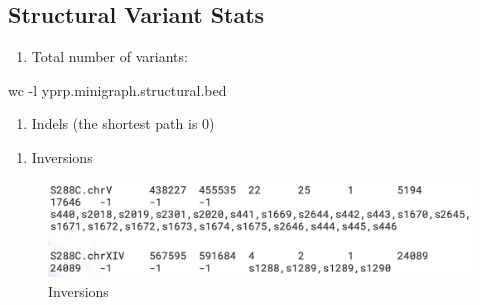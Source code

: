 \documentclass[
]{book}
\newenvironment{Shaded}{\begin{snugshade}}{\end{snugshade}}
\newcommand{\AttributeTok}[1]{\textcolor[rgb]{0.77,0.63,0.00}{#1}}
\newcommand{\ExtensionTok}[1]{#1}
\newcommand{\FunctionTok}[1]{\textcolor[rgb]{0.00,0.00,0.00}{#1}}
\newcommand{\KeywordTok}[1]{\textcolor[rgb]{0.13,0.29,0.53}{\textbf{#1}}}
\newcommand{\NormalTok}[1]{#1}
\newcommand{\StringTok}[1]{\textcolor[rgb]{0.31,0.60,0.02}{#1}}
\providecommand{\tightlist}{%
  \setlength{\itemsep}{0pt}\setlength{\parskip}{0pt}}
\begin{document}
\hypertarget{structural-variant-stats}{%
\subsection*{Structural Variant Stats}\label{structural-variant-stats}}

\begin{enumerate}
\def\labelenumi{\arabic{enumi}.}
\tightlist
\item
  Total number of variants:
\end{enumerate}

\begin{Shaded}
\begin{Highlighting}[]
\FunctionTok{wc} \AttributeTok{{-}l}\NormalTok{ yprp.minigraph.structural.bed}
\end{Highlighting}
\end{Shaded}

\begin{enumerate}
\def\labelenumi{\arabic{enumi}.}
\setcounter{enumi}{1}
\tightlist
\item
  Indels (the shortest path is 0)
\end{enumerate}

\begin{Shaded}
\end{Shaded}

\begin{enumerate}
\def\labelenumi{\arabic{enumi}.}
\setcounter{enumi}{2}
\tightlist
\item
  Inversions
\end{enumerate}

\begin{Shaded}
\end{Shaded}

\begin{figure}
\centering
\includegraphics[width=1\textwidth,height=\textheight]{./Figures/Inversions.png}
\caption{Inversions}
\end{figure}
\end{document}
